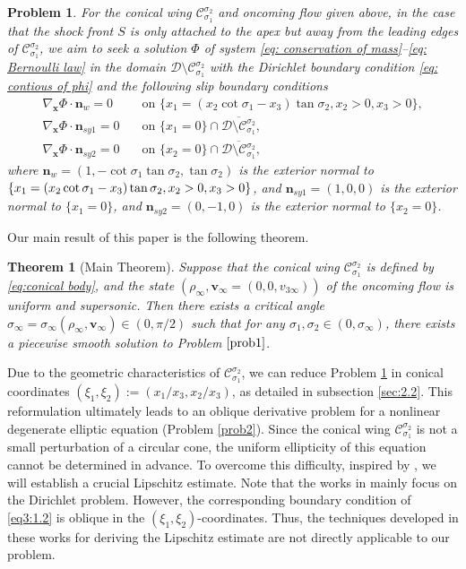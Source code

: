 \documentclass[reqno,12pt]{amsart}
\newtheorem{theorem}{Theorem}[section]
\newtheorem{problem}{Problem}[section]
\numberwithin{equation}{section}
\begin{document}
\begin{problem}\label{prob1}
	For the conical wing $\mathcal{C}_{\sigma_1}^{\sigma_2}$ and oncoming flow given above, in the case that the shock front $S$ is only attached to the apex but away from the leading edges of $\mathcal{C}_{\sigma_1}^{\sigma_2}$, we aim to seek a solution $\Phi$ of system \eqref{eq: conservation of mass}--\eqref{eq: Bernoulli law} in the domain $\mathcal{D}\setminus \mathcal{C}_{\sigma_1}^{\sigma_2}$ with the Dirichlet boundary condition \eqref{eq: contious of phi} and the following slip boundary conditions
	\begin{align}
		\nabla_{\bm{x}}\Phi\cdot\bm{n}_{w}=0 \quad&\text{on $\{x_{1}=(x_2\cot\sigma_1-x_3)\tan\sigma_2,x_{2}>0,x_{3}>0\}$},\label{eq3:1.2}\\	
        \nabla_{\bm{x}}\Phi\cdot\bm{n}_{sy1}=0 \quad&\text{on $\{x_1=0\}\cap\overline{\mathcal{D}\setminus \mathcal{C}_{\sigma_1}^{\sigma_2}}$},\label{eq2:1.2}\\
		\nabla_{\bm{x}}\Phi\cdot\bm{n}_{sy2}=0\quad &\text{on $\{x_2=0\}\cap\overline{\mathcal{D}\setminus \mathcal{C}_{\sigma_1}^{\sigma_2}}$},\label{eq1:1.2}
	\end{align}
    where $\bm{n}_{w}=(1,-\cot\sigma_1\tan\sigma_2,\tan\sigma_2)$ is the exterior normal to $\{x_{1}=(x_2\cot\sigma_1-x_3) \tan\sigma_2,\\x_{2}>0, x_3>0\}$, and $\bm{n}_{sy1}=(1,0,0)$ is the exterior normal to $\{x_1=0\}$, and $\bm{n}_{sy2}=(0,-1,0)$ is the exterior normal to $\{x_2=0\}$.
\end{problem}

Our main result of this paper is the following theorem.

\begin{theorem}[Main Theorem]\label{thm: Main}
	Suppose that the conical wing $\mathcal{C}_{\sigma_1}^{\sigma_2}$ is defined by \eqref{eq:conical body}, and the state $(\rho_{\infty},\bm{v}_{\infty}=(0,0,v_{3\infty}))$ of the oncoming flow is uniform and supersonic. Then there exists a critical angle $\sigma_{\infty}=\sigma_{\infty}(\rho_{\infty},\bm{v}_{\infty})\in(0,{\pi}/{2})$ such that for any $\sigma_{1},\sigma_{2}\in(0,\sigma_{\infty})$, there exists a piecewise smooth solution to Problem $\ref{prob1}$.
\end{theorem}

Due to the geometric characteristics of $\mathcal{C}_{\sigma_1}^{\sigma_2}$, we can reduce Problem \ref{prob1} in conical coordinates $(\xi_1,\xi_2):=(x_1/x_3,x_2/x_3)$, as detailed in subsection \ref{sec:2.2}. This reformulation ultimately leads to an oblique derivative problem for a nonlinear degenerate elliptic equation (Problem \ref{prob2}). Since the conical wing $\mathcal{C}_{\sigma_1}^{\sigma_2}$ is not a small perturbation of a circular cone, the uniform ellipticity of this equation cannot be determined in advance. To overcome this difficulty, inspired by \cite{LY22,Serre09}, we will establish a crucial Lipschitz estimate. Note that the works in \cite{LY22,Serre09} mainly focus on the Dirichlet problem. However, the corresponding boundary condition of \eqref{eq3:1.2} is oblique in the $(\xi_1,\xi_2)$-coordinates. Thus, the techniques developed in these works for deriving the Lipschitz estimate are not directly applicable to our problem. 
\end{document}
